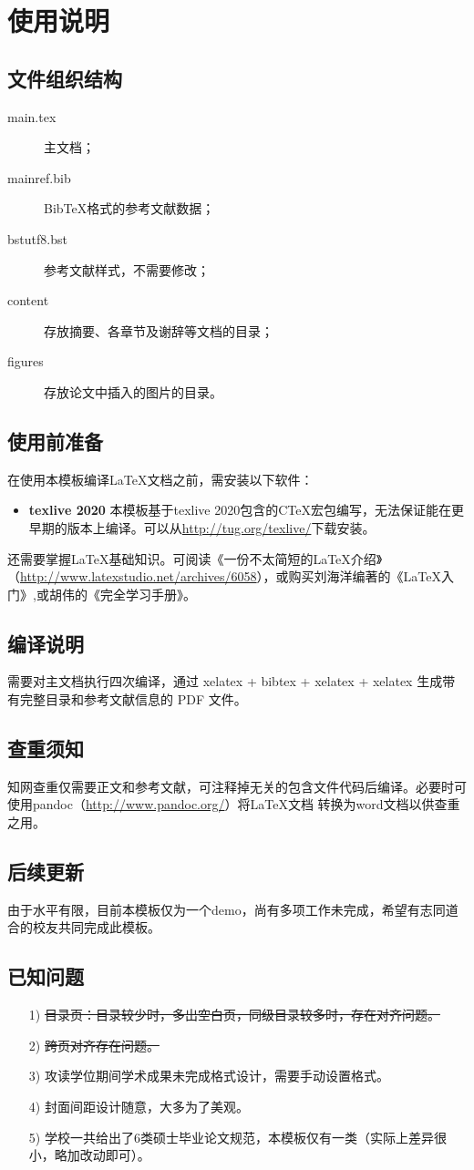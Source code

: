 \chapter{使用说明}


\section{文件组织结构}
\begin{description}
\item[main.tex] 主文档；
\item[mainref.bib] BibTeX格式的参考文献数据；
\item[bstutf8.bst] 参考文献样式，不需要修改；
\item[content] 存放摘要、各章节及谢辞等文档的目录；
\item[figures] 存放论文中插入的图片的目录。
\end{description}
\section{使用前准备}
在使用本模板编译\LaTeX 文档之前，需安装以下软件：
\begin{itemize}

\item{\bf texlive 2020} 本模板基于texlive 2020包含的CTeX宏包编写，无法保证能在更早期的版本上编译。可以从\url{http://tug.org/texlive/}下载安装。
\end{itemize}

还需要掌握\LaTeX 基础知识。可阅读《一份不太简短的\LaTeX 介绍》（\url{http://www.latexstudio.net/archives/6058}），或购买刘海洋编著的《\LaTeX 入门》,或胡伟的《\LaTeXe 完全学习手册》。

\section{编译说明}
需要对主文档执行四次编译，通过 xelatex + bibtex + xelatex + xelatex 生成带有完整目录和参考文献信息的 PDF 文件。

\section{查重须知}
知网查重仅需要正文和参考文献，可注释掉无关的包含文件代码后编译。必要时可使用pandoc（\url{http://www.pandoc.org/}）将\LaTeX 文档 转换为word文档以供查重之用。

\section{后续更新}
由于水平有限，目前本模板仅为一个demo，尚有多项工作未完成，希望有志同道合的校友共同完成此模板。

\section{已知问题}
\begin{itemize}
	\item[1)] \sout{目录页：目录较少时，多出空白页，同级目录较多时，存在对齐问题。}
	\item[2)] \sout{跨页对齐存在问题。}
	\item[3)] 攻读学位期间学术成果未完成格式设计，需要手动设置格式。
	\item[4)] 封面间距设计随意，大多为了美观。
	\item[5)] 学校一共给出了6类硕士毕业论文规范，本模板仅有一类（实际上差异很小，略加改动即可）。
	
\end{itemize}
